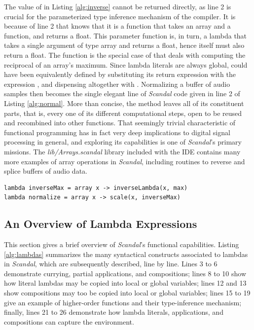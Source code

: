 The value of  in Listing \ref{alg:inverse} cannot be returned directly, as line 2 is crucial for the parameterized type inference mechanism of the compiler. It is because of line 2 that  knows that it is a function that takes an array and a function, and returns a float. This parameter function is, in turn, a lambda that takes a single argument of type array and returns a float, hence  itself must also return a float. The function  is the special case of  that deals with computing the reciprocal of an array's maximum. Since lambda literals are always global,  could have been equivalently defined by substituting its return expression with the expression , and dispensing altogether with . Normalizing a buffer of audio samples then becomes the single elegant line of \emph{Scandal} code given in line 2 of Listing \ref{alg:normal}. More than concise, the  method leaves all of its constituent parts, that is, every one of its different computational steps, open to be reused and recombined into other functions. That seemingly trivial characteristic of functional programming has in fact very deep implications to digital signal processing in general, and exploring its capabilities is one of \emph{Scandal}'s primary missions. The \emph{lib/Arrays.scandal} library included with the IDE contains many more examples of array operations in \emph{Scandal}, including routines to reverse and splice buffers of audio data.

\begin{lstlisting}[emph={lambda,array},emphstyle={\textbf},caption={Normalizing an array.},label={alg:normal}]
lambda inverseMax = array x -> inverseLambda(x, max)
lambda normalize = array x -> scale(x, inverseMax)
\end{lstlisting}

\subsection{An Overview of Lambda Expressions}

This section gives a brief overview of \emph{Scandal}'s functional capabilities. Listing \ref{alg:lambdas} summarizes the many syntactical constructs associated to lambdas in \emph{Scandal}, which are subsequently described, line by line. Lines 3 to 6 demonstrate currying, partial applications, and compositions; lines 8 to 10 show how literal lambdas may be copied into local or global variables; lines 12 and 13 show compositions may too be copied into local or global variables; lines 15 to 19 give an example of higher-order functions and their type-inference mechanism; finally, lines 21 to 26 demonstrate how lambda literals, applications, and compositions can capture the environment. 

